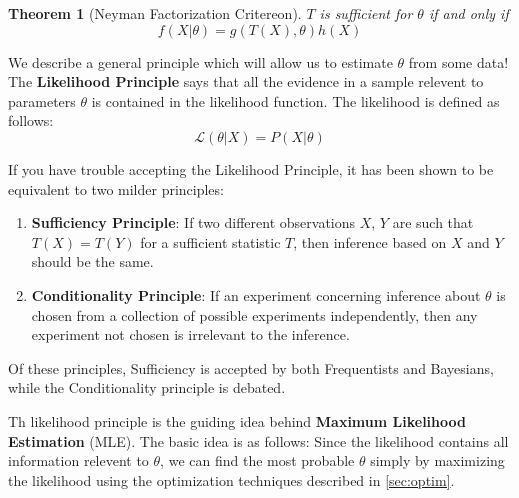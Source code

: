 \documentclass[]{article}
\theoremstyle{mattstyle}
\newtheorem{theorem}{Theorem}[section]
\theoremstyle{definition}
\begin{document}
\begin{theorem}[Neyman Factorization Critereon]
	$T$ is sufficient for $\theta$ if and only if $$f(X|\theta) = g(T(X),\theta)h(X)$$
\end{theorem}

We describe a general principle which will allow us to estimate $\theta$ from some data! The \textbf{Likelihood Principle} says that all the evidence in a sample relevent to parameters \(\theta\) is contained in the likelihood function. The likelihood is defined as follows:
$$ \mathcal{L}(\theta | X) = P(X | \theta)$$

If you have trouble accepting the Likelihood Principle, it has been shown to be equivalent to two milder principles:
\begin{enumerate}
	\item \textbf{Sufficiency Principle}: If two different observations $X$, $Y$ are such that $T(X) = T(Y)$ for a sufficient statistic $T$, then inference based on $X$ and $Y$ should be the same.
	\item \textbf{Conditionality Principle}: If an experiment concerning inference about $\theta$ is chosen from a collection of
	possible experiments independently, then any experiment not chosen is irrelevant to the inference.
\end{enumerate}

Of these principles, Sufficiency is accepted by both Frequentists and Bayesians, while the Conditionality principle is debated. 

Th likelihood principle is the guiding idea behind \textbf{Maximum Likelihood Estimation} (MLE). The basic idea is as follows: Since the likelihood contains all information relevent to $\theta$, we can find the most probable $\theta$ simply by maximizing the likelihood using the optimization techniques described in \ref{sec:optim}. 

\newpage
\end{document}
